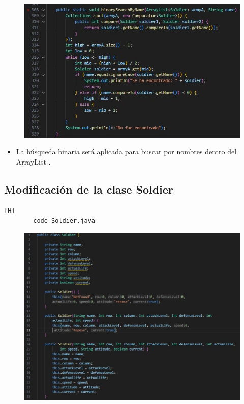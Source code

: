 \documentclass{article}
\begin{document}
	\begin{figure}[H]
		\centering
		\includegraphics[width=1\textwidth,keepaspectratio]{img/binarySearchByName.jpg}
	\end{figure}
	

	\begin{itemize}	
		\item La búsqueda binaria será aplicada para buscar por nombres dentro del ArrayList . 
	\end{itemize}
	
	\subsection{Modificación de la clase Soldier}
	
	\begin{lstlisting}[language=bash,caption={Se han aumentado atributos y se crearon tres sobreconstructores sobrecargads }][H]
		code Soldier.java
	\end{lstlisting}
	\begin{figure}[H]
		\centering
		\includegraphics[width=1\textwidth,keepaspectratio]{img/constructors.jpg}
	\end{figure}
	
\end{document}
